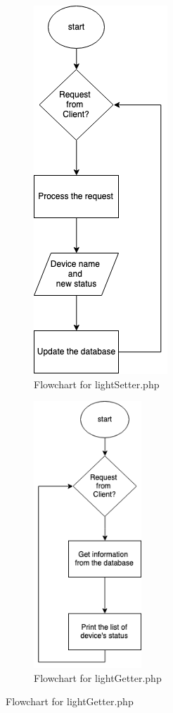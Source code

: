 \documentclass[12pt,a4paper]{report}
\begin{document}
\begin{figure}[H]
	\begin{subfigure}{.5\textwidth}
		\centering
		\includegraphics[width=.5\linewidth]{figures/lightSetter.png}
		\caption{Flowchart for lightSetter.php}
	\end{subfigure}
	\begin{subfigure}{.5\textwidth}
		\centering
		\includegraphics[height= 10cm, width=.5\linewidth]{figures/lightGetter.png}
		\caption{Flowchart for lightGetter.php}
	\end{subfigure}
\end{figure}
\end{document}
